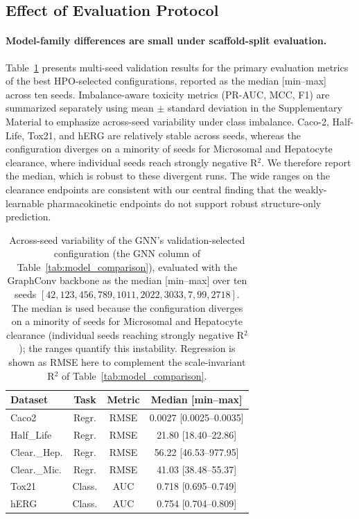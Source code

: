 \documentclass[journal]{IEEEtran}
\begin{document}
\subsection{Effect of Evaluation Protocol}
\label{sec:eval_protocol}

\paragraph{Model-family differences are small under scaffold-split evaluation.}
Table~\ref{tab:multiseed} presents multi-seed validation results for the primary evaluation metrics of the best HPO-selected configurations, reported as the median [min--max] across ten seeds. Imbalance-aware toxicity metrics (PR-AUC, MCC, F1) are summarized separately using mean $\pm$ standard deviation in the Supplementary Material to emphasize across-seed variability under class imbalance. Caco-2, Half-Life, Tox21, and hERG are relatively stable across seeds, whereas the configuration diverges on a minority of seeds for Microsomal and Hepatocyte clearance, where individual seeds reach strongly negative R$^2$. We therefore report the median, which is robust to these divergent runs. The wide ranges on the clearance endpoints are consistent with our central finding that the weakly-learnable pharmacokinetic endpoints do not support robust structure-only prediction.

\begin{table}[!t]
\centering

\caption{Across-seed variability of the GNN's validation-selected configuration (the GNN column of Table~\ref{tab:model_comparison}), evaluated with the GraphConv backbone as the median [min--max] over ten seeds $[42, 123, 456, 789, 1011, 2022, 3033, 7, 99, 2718]$. The median is used because the configuration diverges on a minority of seeds for Microsomal and Hepatocyte clearance (individual seeds reaching strongly negative R$^2$); the ranges quantify this instability. Regression is shown as RMSE here to complement the scale-invariant R$^2$ of Table~\ref{tab:model_comparison}.}
\label{tab:multiseed}
\small
\begin{tabular}{lccc}
\textbf{Dataset} & \textbf{Task} & \textbf{Metric} & \textbf{Median [min--max]} \\
\midrule
Caco2 & Regr. & RMSE & 0.0027 [0.0025--0.0035] \\
Half\_Life & Regr. & RMSE & 21.80 [18.40--22.86] \\
Clear.\_Hep. & Regr. & RMSE & 56.22 [46.53--977.95] \\
Clear.\_Mic. & Regr. & RMSE & 41.03 [38.48--55.37] \\
Tox21 & Class. & AUC & 0.718 [0.695--0.749] \\
hERG & Class. & AUC & 0.754 [0.704--0.809] \\
\bottomrule
\end{tabular}
\end{table}
\end{document}
